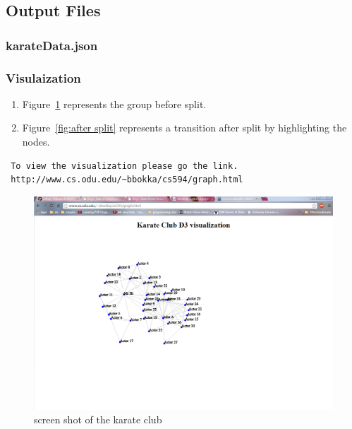 \documentclass[12pt]{article}
\begin{document}
\subsection{Output Files}
\subsubsection{karateData.json}

\newpage
\subsubsection{Visulaization}
\begin{enumerate}
    \item Figure~\ref{fig:before split} represents the group before split.
    \item Figure~\ref{fig:after split} represents a transition after split by highlighting the nodes.
\end{enumerate}
\begin{verbatim}
 To view the visualization please go the link.
 http://www.cs.odu.edu/~bbokka/cs594/graph.html
\end{verbatim}
\begin{figure}[ht]
\includegraphics[scale=0.6]{../beforeSplit}
\centering
\caption{screen shot of the karate club}
\label{fig:before split}
\end{figure}
\newpage
\end{document}
